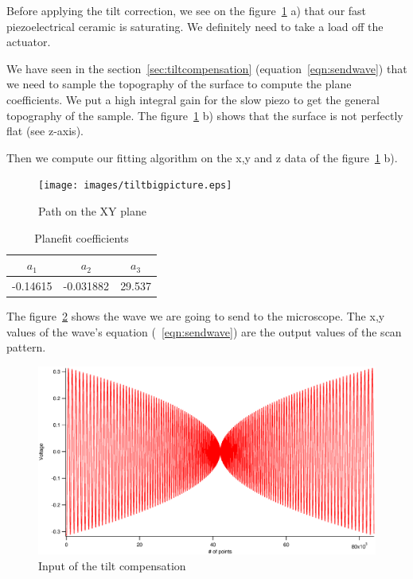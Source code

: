 Before applying the tilt correction, we see on the figure~\ref{fig:tiltwaves} a) that our fast piezoelectrical ceramic is saturating. We definitely need to take a load off the actuator.

We have seen in the section~\ref{sec:tiltcompensation} (equation~\ref{eqn:sendwave}) that we need to sample the topography of the surface to compute the plane coefficients. We put a high integral gain for the slow piezo to get the general topography of the sample. The figure~\ref{fig:tiltwaves} b) shows that the surface is not perfectly flat (see z-axis).

Then we compute our fitting algorithm on the x,y and z data of the figure~\ref{fig:tiltwaves} b).


\begin{figure}[!ht]
\centering
\texttt{[image: images/tiltbigpicture.eps]}
\caption{Path on the XY plane}
\label{fig:tiltwaves}
\end{figure}

\begin{table}[H]

\centering %
\begin{tabular}{c c c} %
\hline\hline %
$a_1$ & $a_2$ & $a_3$ \\ [0.5ex] %
\hline %
-0.14615  & -0.031882 & 29.537 \\[1ex]
\hline %
\end{tabular}
\caption{Planefit coefficients} %
\label{table:planefit} %
\end{table}

The figure~\ref{fig:spiralztiltout} shows the wave we are going to send to the microscope. The x,y values of the wave's equation (~\ref{eqn:sendwave}) are the output values of the scan pattern.

\begin{figure}[H]
  \centering
  \includegraphics[scale=0.2]{images/spiralztiltout.eps}
    \caption{Input of the tilt compensation}
  \label{fig:spiralztiltout}
\end{figure}

